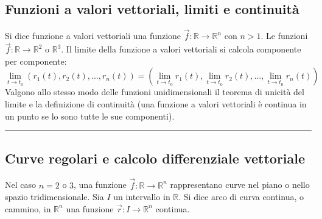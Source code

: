 \subsection*{Funzioni a valori vettoriali, limiti e continuità}
Si dice funzione a valori vettoriali una funzione $\vec{f} : \mathbb{R} \rightarrow  \mathbb{R}^n$ con $n > 1$. Le funzioni $\vec{f} : \mathbb{R} \rightarrow \mathbb{R}^2$ o $\mathbb{R}^3$.\newline
Il limite della funzione a valori vettoriali si calcola componente per componente:
\[
    \lim_{t\rightarrow t_0}(r_1(t), r_2(t), \dots, r_n(t)) = \left(\lim_{t\rightarrow t_0}r_1(t), \lim_{t\rightarrow t_0}r_2(t), \dots, \lim_{t\rightarrow t_0}r_n(t)\right)
\]
Valgono allo stesso modo delle funzioni unidimensionali il teorema di unicità del limite e la definizione di continuità (una funzione a valori vettoriali è continua in un punto se lo sono tutte le sue componenti).\newline
\rule{\textwidth}{2pt}
\subsection*{Curve regolari e calcolo differenziale vettoriale}
Nel caso $n = 2$ o $3$, una funzione $\vec{f} : \mathbb{R} \rightarrow  \mathbb{R}^n$ rappresentano curve nel piano o nello spazio tridimensionale.\newline
Sia $I$ un intervallo in $\mathbb{R}$. Si dice arco di curva continua, o cammino, in $\mathbb{R}^n$ una funzione $\vec{r}: I \rightarrow \mathbb{R}^n$ continua.\newline
